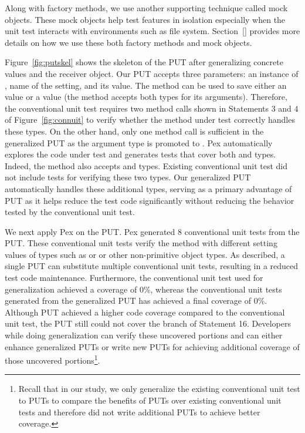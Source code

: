 Along with factory methods, we use another supporting technique called mock objects. These mock objects help test features in isolation especially when the unit test interacts with environments such as file system. Section~\ref{} provides more details on how we use these both factory methods and mock objects.

Figure~\ref{fig:putskel} shows the skeleton of the PUT after generalizing concrete values and the receiver object. Our PUT accepts three parameters: an instance of , name of the setting, and its value. The  method can be used to save either an  value or a  value (the method accepts both types for its arguments). Therefore, the conventional unit test requires two method calls shown in Statements $3$ and $4$ of Figure~\ref{fig:connuit} to verify whether the method under test correctly handles these types. On the other hand, only one method call is sufficient in the generalized PUT as the argument type is promoted to . Pex automatically explores the code under test and generates tests that cover both  and  types. Indeed, the  method also accepts  and  types. Existing conventional unit test did not include tests for verifying these two types. Our generalized PUT automatically handles these additional types, serving as a primary advantage of PUT as it helps reduce the test code significantly without reducing the behavior tested by the conventional unit test.

We next apply Pex on the  PUT. Pex generated $8$ conventional unit tests from the  PUT. These conventional unit tests verify the  method with different setting values of types such as  or  or other non-primitive object types. As described, a single PUT can substitute multiple conventional unit tests, resulting in a reduced test code maintenance. Furthermore, the conventional unit test used for generalization achieved a coverage of $0$\%, whereas the conventional unit tests generated from the generalized PUT has achieved a final coverage of $0$\%. Although PUT achieved a higher code coverage compared to the conventional unit test, the PUT still could not cover the  branch of Statement 16. Developers while doing generalization can verify these uncovered portions and can either enhance generalized PUTs or write new PUTs for achieving additional coverage of those uncovered portions\footnote{Recall that in our study, we only generalize the existing conventional unit test to PUTs to compare the benefits of PUTs over existing conventional unit tests and therefore did not write additional PUTs to achieve better coverage.}. 

